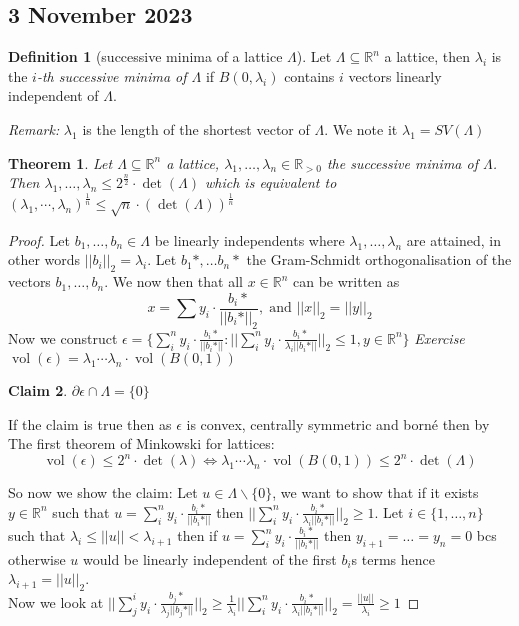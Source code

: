 \documentclass[a4paper,11pt,american]{article}
\newcommand{\R}{\mathbb{R}}
\DeclareMathOperator{\vol}{vol}
\theoremstyle{plain}
\newtheorem{theorem}{Theorem}
\newtheorem{claim}[theorem]{Claim}
\theoremstyle{definition}
\newtheorem{definition}{Definition}
\begin{document}
\subsection*{3 November 2023}

\begin{definition}[successive minima of a lattice $\Lambda$]
    Let $\Lambda\subseteq \R^n$ a lattice, then $\lambda_i$ is the \emph{$i$-th successive minima of $\Lambda
    $} if $B(0,\lambda_i)$ contains $i$ vectors linearly independent of $\Lambda$.
\end{definition}
\emph{Remark:} $\lambda_1$ is the length of the shortest vector of $\Lambda$. We note it $\lambda_1=SV(\Lambda)$
\begin{theorem}
    Let $\Lambda\subseteq \R^n$ a lattice, $\lambda_1,\dots,\lambda_n\in\R_{>0}$ the successive minima of $\Lambda$. Then $\lambda_1,\dots,\lambda_n\leq 2^\frac{n}{2}\cdot\det(\Lambda)$ which is equivalent to  $(\lambda_1,\cdots,\lambda_n)^{\frac{1}{n}}\leq \sqrt{n}\cdot(\det(\Lambda))^{\frac{1}{n}}$
\end{theorem}
\begin{proof}
    Let $b_1,\dots,b_n\in\Lambda$ be linearly independents where $\lambda_1,\dots,\lambda_n$ are attained, in other words $\vert\vert b_i\vert\vert_2=\lambda_i$.
    Let $b_1*,\dots b_n*$ the Gram-Schmidt orthogonalisation of the vectors $b_1,\dots,b_n$. We now then that all $x\in\R^n$ can be written as $$x=\sum y_i\cdot \frac{b_i*}{\vert\vert b_i*\vert\vert_2},\; \text{and } \vert\vert x\vert\vert_2=\vert\vert y\vert\vert_2$$
    Now we construct $\epsilon=\{\sum_i^n y_i\cdot \frac{b_i*}{\vert\vert b_i*\vert\vert}:\vert\vert\sum_i^n y_i\cdot \frac{b_i*}{\lambda_i\vert\vert b_i*\vert\vert}\vert\vert_2\leq 1, y\in\R^n\}$
    \emph{Exercise} $\vol(\epsilon)=\lambda_1\cdots\lambda_n\cdot\vol(B(0,1))$
    \begin{claim}
        $\partial\epsilon\cap\Lambda=\{0\}$
    \end{claim}
    If the claim is true then as $\epsilon$ is convex, centrally symmetric and borné then by The first theorem of Minkowski for lattices: $$\vol(\epsilon)\leq 2^n\cdot\det(\lambda)\iff \lambda_1\cdots\lambda_n\cdot\vol(B(0,1))\leq 2^n\cdot\det(\Lambda)$$

    So now we show the claim: Let $u\in\Lambda\backslash\{0\}$, we want to show that if it exists $y\in\R^n$ such that $u=\sum_i^n y_i\cdot \frac{b_i*}{\vert\vert b_i*\vert\vert}$ then $\vert\vert\sum_i^n y_i\cdot \frac{b_i*}{\lambda_i\vert\vert b_i*\vert\vert}\vert\vert_2\geq 1$.
    Let $i\in\{1,\dots,n\}$ such that $\lambda_i\leq \vert\vert u\vert\vert<\lambda_{i+1}$ then if $u=\sum_i^n y_i\cdot \frac{b_i*}{\vert\vert b_i*\vert\vert}$ then $y_{i+1}=\dots=y_n=0$ bcs otherwise $u$ would be linearly independent of the first $b_i$s terms hence $\lambda_{i+1}=\vert\vert u\vert\vert_2$.\\
    Now we look at $\vert\vert\sum_j^i y_i\cdot \frac{b_j*}{\lambda_j\vert\vert b_j*\vert\vert}\vert\vert_2\geq\frac{1}{\lambda_i}\vert\vert\sum_i^n y_i\cdot \frac{b_i*}{\lambda_i\vert\vert b_i*\vert\vert}\vert\vert_2=\frac{\vert\vert u\vert\vert}{\lambda_i}\geq 1$
\end{proof}
\end{document}
